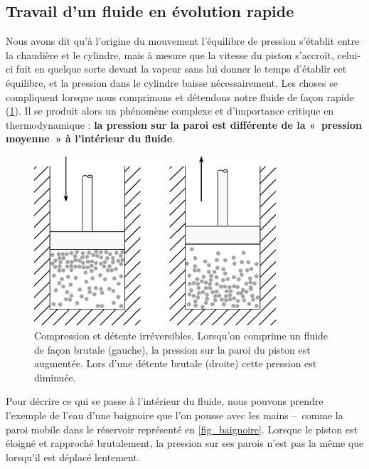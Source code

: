 	\subsection{Travail d’un fluide en évolution rapide}
	\label{ch_évolutions_irr_sf}

			Nous avons dit qu’à l’origine du mouvement l’équilibre de pression s’établit entre la chaudière et le cylindre, mais à mesure que la vitesse du piston s’accroît, celui-ci fuit en quelque sorte devant la vapeur sans lui donner le temps d’établir cet équilibre, et la pression dans le cylindre baisse \mbox{nécessairement}.
		Les choses se compliquent lorsque nous comprimons et détendons notre fluide de façon rapide (\cref{fig_molécules_rapide}). Il se produit alors un phénomène complexe et d’importance critique en thermodynamique : \textbf{la pression sur la paroi est différente de la «~pression moyenne~» à l’intérieur du fluide}.

		\begin{figure}
			\begin{center}
			\includegraphics[width=9cm]{images/particules_compression_rapide.png}
			\end{center}
			\caption{Compression et détente irréversibles. Lorsqu’on comprime un fluide de façon brutale (gauche), la pression sur la paroi du piston est augmentée. Lors d’une détente brutale (droite) cette pression est diminuée.}
			\label{fig_molécules_rapide}
		\end{figure}

		Pour décrire ce qui se passe à l’intérieur du fluide, nous pouvons prendre l’exemple de l’eau d’une baignoire que l’on pousse avec les mains --\ comme la paroi mobile dans le réservoir représenté en \cref{fig_baignoire}. Lorsque le piston est éloigné et rapproché brutalement, la pression sur ses parois n’est pas la même que lorsqu’il est déplacé lentement.

